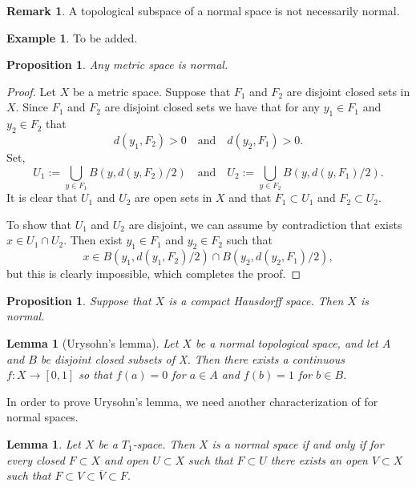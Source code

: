 \documentclass[11pt,a4paper]{article}
\theoremstyle{definition}
\newtheorem{remark}{Remark}[section]
\newtheorem{example}{Example}[section]
\theoremstyle{plain}
\newtheorem{proposition}[theorem]{Proposition}
\newtheorem{lemma}[theorem]{Lemma}
\newcommand{\tand}{\quad \text{and} \quad}
\begin{document}
  \begin{remark}
    A topological subspace of a normal space is not necessarily normal.
  \end{remark}
  \begin{example}
    To be added.
  \end{example}

  \begin{proposition}
    Any metric space is normal.
  \end{proposition}
  \begin{proof}
    Let $X$ be a metric space.
    Suppose that $F_1$ and $F_2$ are disjoint closed sets in $X$.
    Since $F_1$ and $F_2$ are disjoint closed sets we have that for any
    $y_1 \in F_1$ and $y_2 \in F_2$ that
    \[
      d(y_1,F_2) > 0 \tand d(y_2,F_1) > 0.
    \]
    Set,
    \[
      U_1 := \bigcup_{y \in F_1} B(y,d(y,F_2) / 2) \tand
      U_2 := \bigcup_{y \in F_2} B(y,d(y,F_1) / 2).
    \]
    It is clear that $U_1$ and $U_2$ are open sets in $X$ and that 
    $F_1 \subset U_1$ and $F_2 \subset U_2$.

    To show that $U_1$ and $U_2$ are disjoint, we can assume by contradiction
    that exists $x \in U_1 \cap U_2$. Then exist $y_1 \in F_1$ and
    $y_2 \in F_2$ such that
    \[
      x \in B(y_1,d(y_1,F_2) / 2) \cap B(y_2,d(y_2,F_1) / 2),
    \]
    but this is clearly impossible, which completes the proof.
  \end{proof}

  \begin{proposition}
    Suppose that $X$ is a compact Hausdorff space. Then $X$ is normal.
  \end{proposition}


  \begin{lemma}[Urysohn’s lemma]\label{lem:urysohn}
    Let $X$ be a normal topological space, 
    and let $A$ and $B$ be disjoint closed subsets of X.
    Then there exists a continuous $f \colon X \to [0,1]$
    so that $f(a) = 0$ for $a \in A$ and $f(b) = 1$ for $b \in B$.
  \end{lemma}

  In order to prove Urysohn's lemma, we need another characterization of
  for normal spaces.

  \begin{lemma}
    Let $X$ be a $T_1$-space. Then $X$ is a normal space if and only if
    for every closed $F \subset X$ and open $U \subset X$ such that
    $F \subset U$ there exists an open $V \subset X$ such that
    $F \subset V \subset \overline{V} \subset F$.
  \end{lemma}
\end{document}

